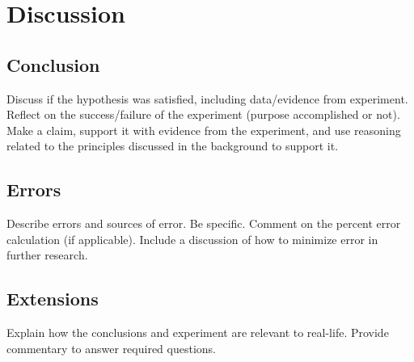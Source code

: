 \documentclass[stu,biblatex,floatsintext,draftall]{apa7}
\begin{document}
\section{Discussion}

\subsection{Conclusion}
Discuss if the hypothesis was satisfied, including data/evidence from experiment. Reflect on the success/failure of the experiment (purpose accomplished or not). Make a claim, support it with evidence from the experiment, and use reasoning related to the principles discussed in the background to support it.

\subsection{Errors}
Describe errors and sources of error. Be specific. Comment on the percent error calculation (if applicable).  Include a discussion of how to minimize error in further research. 

\subsection{Extensions}
Explain how the conclusions and experiment are relevant to real-life.  Provide commentary to answer required questions. 

\printbibliography
\end{document}
